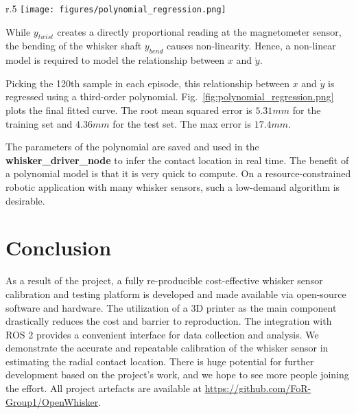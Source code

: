 \documentclass[runningheads]{llncs}
\begin{document}
\begin{wrapfigure}{r}{.5\textwidth}
    \centering
    \texttt{[image: figures/polynomial\_regression.png]}
    \caption{Polynomial Regression of the relationship 100th sample of \(\dot{y}\) in each episode and the contact distance \(x\)}
    \label{fig:polynomial_regression.png}
\end{wrapfigure}

While \(y_{twist}\) creates a directly proportional reading at the magnetometer sensor, the bending of the whisker shaft \(y_{bend}\) causes non-linearity. Hence, a non-linear model is required to model the relationship between \(x\) and \(\dot{y}\).

Picking the 120th sample in each episode, this relationship between \(x\) and \(\dot{y}\) is regressed using a third-order polynomial. Fig.~\ref*{fig:polynomial_regression.png} plots the final fitted curve. The root mean squared error is $5.31 mm$ for the training set and $4.36 mm$ for the test set. The max error is $17.4 mm$.

The parameters of the polynomial are saved and used in the \textbf{whisker\_driver\_node} to infer the contact location in real time. The benefit of a polynomial model is that it is very quick to compute. On a resource-constrained robotic application with many whisker sensors, such a low-demand algorithm is desirable.

\section{Conclusion}

As a result of the project, a fully re-producible cost-effective whisker sensor calibration and testing platform is developed and made available via open-source software and hardware. The utilization of a 3D printer as the main component drastically reduces the cost and barrier to reproduction. The integration with ROS 2 provides a convenient interface for data collection and analysis. We demonstrate the accurate and repeatable calibration of the whisker sensor in estimating the radial contact location. There is huge potential for further development based on the project's work, and we hope to see more people joining the effort. All project artefacts are available at \url{https://github.com/FoR-Group1/OpenWhisker}.


\end{document}
